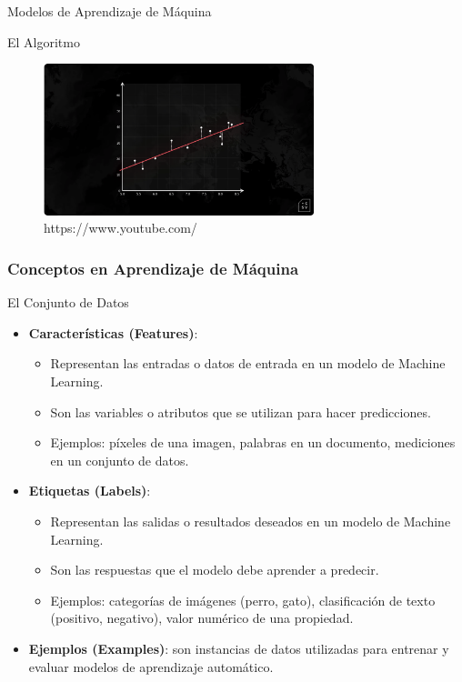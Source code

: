 \documentclass{beamer}
\begin{document}
\begin{frame}{Modelos de Aprendizaje de Máquina}
\begin{block}{El Algoritmo}
	\begin{figure}
		\includegraphics[width=0.7\textwidth]{modelo-algoritmo_3}
		\caption{https://www.youtube.com/}
		\centering
	\end{figure}
\end{block}

\end{frame}

	

\begin{frame}
	\frametitle{Conceptos en Aprendizaje de Máquina}
			\begin{block}{El Conjunto de Datos}
	\begin{itemize}
		\item \textbf{Características (Features)}:
		\begin{itemize}
			\item Representan las entradas o datos de entrada en un modelo de Machine Learning.
			\item Son las variables o atributos que se utilizan para hacer predicciones.
			\item Ejemplos: píxeles de una imagen, palabras en un documento, mediciones en un conjunto de datos.
		\end{itemize}			
		\item \textbf{Etiquetas (Labels)}:
		\begin{itemize}
			\item Representan las salidas o resultados deseados en un modelo de Machine Learning.
			\item Son las respuestas que el modelo debe aprender a predecir.
			\item Ejemplos: categorías de imágenes (perro, gato), clasificación de texto (positivo, negativo), valor numérico de una propiedad.
		\end{itemize}
		\item \textbf{Ejemplos (Examples)}: son instancias de datos utilizadas para entrenar y evaluar modelos de aprendizaje automático.
	\end{itemize}
		\end{block}
\end{frame}
\end{document}
